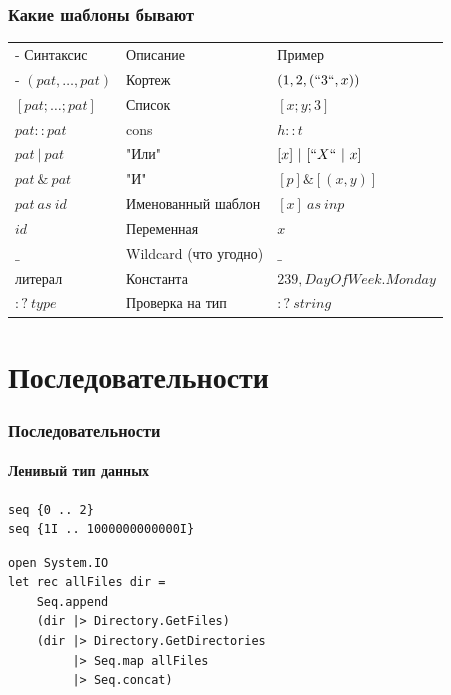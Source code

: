 \documentclass[xetex,mathserif,serif]{beamer}
\begin{document}
	\begin{frame}
		\frametitle{Какие шаблоны бывают}
		\begin{small}
			\begin{tabu} {| X[0.9 l p] | X[1 l p] | X[1 l p] |}
				\tabucline-
				Синтаксис                               & Описание                  & Пример                  \\
				\tabucline-
				\everyrow{\tabucline-}
				$(pat, \ldots, pat)$                    & Кортеж                    & $(1, 2, (``3``, x))$    \\
				$[pat; \ldots; pat]$                    & Список                    & $[x; y; 3]$             \\
				$pat :: pat$                            & cons                      & $h :: t$                \\
				$pat\ |\ pat$                           & "Или"                     & $[x]\ |\ [``X``\ |\ x]$ \\
				$pat\ \&\ pat$                          & "И"                       & $[p] \& [(x, y)]$       \\
				$pat\ as\ id$                           & Именованный шаблон        & $[x]\ as\ inp$          \\
				$id$                                    & Переменная                & $x$                     \\
				$\_$                                    & Wildcard (что угодно)     & $\_$                    \\
				литерал                                 & Константа                 & $239, DayOfWeek.Monday$ \\
				$:?\ type$                              & Проверка на тип           & $:?\ string$            \\
			\end{tabu}
		\end{small}
	\end{frame}

	\section{Последовательности}
	
	\begin{frame}[fragile]
		\frametitle{Последовательности}
		\framesubtitle{Ленивый тип данных}
		\begin{verbatim}
seq {0 .. 2}
seq {1I .. 1000000000000I}
		\end{verbatim}

		\begin{verbatim}
open System.IO
let rec allFiles dir =
    Seq.append
    (dir |> Directory.GetFiles)
    (dir |> Directory.GetDirectories 
         |> Seq.map allFiles 
         |> Seq.concat)
		\end{verbatim}
\end{frame}
\end{document}
